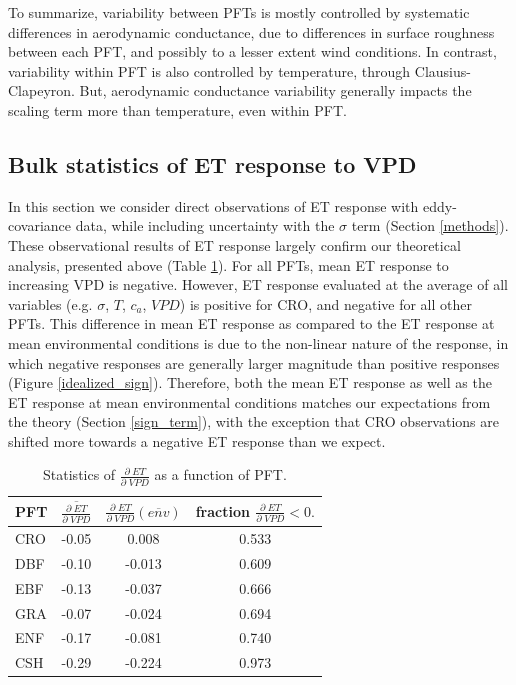 \documentclass[draft,linenumbers]{gcbjournal}
\begin{document}
To summarize, variability between PFTs is mostly controlled by systematic differences in aerodynamic conductance, due to differences in surface roughness between each PFT, and possibly to a lesser extent wind conditions. In contrast, variability within PFT is also controlled by temperature, through Clausius-Clapeyron. But, aerodynamic conductance variability generally impacts the scaling term more than temperature, even within PFT.

\subsection{Bulk statistics of ET response to VPD}
\label{stats_sec}

In this section we consider direct observations of ET response with eddy-covariance data, while including uncertainty with the $\sigma$ term (Section \ref{methods}). These observational results of ET response largely confirm our theoretical analysis, presented above (Table \ref{stats}). For all PFTs, mean ET response to increasing VPD is negative. However, ET response evaluated at the average of all variables (e.g. $\sigma$, $T$, $c_a$, $VPD$) is positive for CRO, and negative for all other PFTs. This difference in mean ET response as compared to the ET response at mean environmental conditions is due to the non-linear nature of the response, in which negative responses are generally larger magnitude than positive responses (Figure \ref{idealized_sign}). Therefore, both the mean ET response as well as the ET response at mean environmental conditions matches our expectations from the theory (Section \ref{sign_term}), with the exception that CRO observations are shifted more towards a negative ET response than we expect.

\begin{table}
\caption{Statistics of $\frac{\partial \; ET}{\partial \; VPD}$ as a function of PFT.}
\centering
\begin{tabular}{l c c c}
  \hline
PFT & $\overline{\frac{\partial \; ET}{\partial \; VPD}}$ & $\frac{\partial \; ET}{\partial \; VPD}\left(\overline{env}\right)$ & fraction $\frac{\partial \; ET}{\partial \; VPD} < 0.$ \\
  \hline
  CRO & -0.05 & 0.008 &  0.533 \\
  DBF & -0.10 & -0.013 &  0.609 \\
  EBF & -0.13 & -0.037 &  0.666 \\
  GRA & -0.07 & -0.024 &  0.694 \\
  ENF & -0.17 & -0.081 &  0.740 \\
  CSH & -0.29 & -0.224 &  0.973 \\
  \hline
\end{tabular}
  \label{stats}
\end{table}
\end{document}
